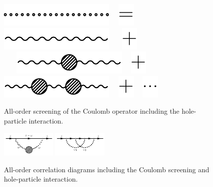 \documentclass[10pt,twocolumn,a4paper]{article}%
\begin{document}
\begin{figure}%
\centering
\includegraphics[height=0.035\textwidth]{img/Sigma/CoulombAll}~~
\includegraphics[height=0.035\textwidth]{img/Sigma/equals}~~
\includegraphics[height=0.035\textwidth]{img/Sigma/CoulombScreening0}~~~
\includegraphics[height=0.035\textwidth]{img/Sigma/plus}\\~~~
\includegraphics[height=0.035\textwidth]{img/Sigma/CoulombScreening_hp}~~
\includegraphics[height=0.035\textwidth]{img/Sigma/plus}~~
\includegraphics[height=0.035\textwidth]{img/Sigma/CoulombScreening_hp_2}~~
\includegraphics[height=0.035\textwidth]{img/Sigma/plus}~~
\includegraphics[height=0.035\textwidth]{img/Sigma/dotdotdot}
\caption{\label{fig:DressedCoulomb}\small All-order screening of the Coulomb operator including the hole-particle interaction.}
\end{figure}


\begin{figure}%
\centering
\includegraphics[width=0.235\textwidth]{img/Sigma/AODirect}
\includegraphics[width=0.235\textwidth]{img/Sigma/AOExch}
\caption{\label{fig:SigmaAO-Feyn}\small All-order correlation diagrams including the Coulomb screening and hole-particle interaction.}
\end{figure}
\end{document}
